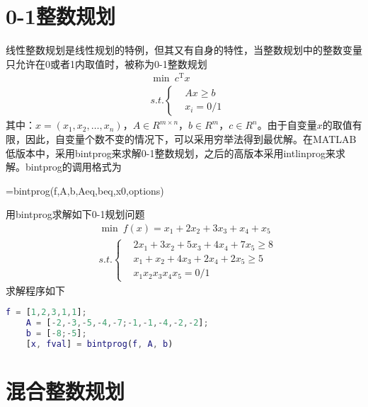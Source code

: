 \section{0-1整数规划}
    \par
    线性整数规划是线性规划的特例，但其又有自身的特性，当整数规划中的整数变量只允许在0或者1内取值时，被称为0-1整数规划
    \begin{align*}
    & \mathop{\min}\ c^\mathrm{T} x\\
    &s.t.\left\{
    \begin{aligned}
    &Ax \geqslant b\\
    &x_i = 0/1
    \end{aligned}
    \right.
    \end{align*}
    其中：$x=(x_1,x_2,\ldots,x_n)$，$A \in R^{m\times n}$，$b \in R^m$，$c \in R^n$。由于自变量$x$的取值有限，因此，自变量个数不变的情况下，可以采用穷举法得到最优解。在MATLAB低版本中，采用bintprog来求解0-1整数规划，之后的高版本采用intlinprog来求解。bintprog的调用格式为
    \par
    [x,fval,exitflag,output]=bintprog(f,A,b,Aeq,beq,x0,options)
    \par
    用bintprog求解如下0-1规划问题
    \begin{align*}
    &\mathop {\min} \ f(x)=x_1+2x_2+3x_3+x_4+x_5\\
    &s.t.\left\{
    \begin{aligned}
    &2x_1+3x_2+5x_3+4x_4+7x_5 \geqslant 8\\
    &x_1+x_2+4x_3+2x_4+2x_5 \geqslant 5\\
    &x_1x_2x_3x_4x_5 = 0/1
    \end{aligned}
    \right.
    \end{align*}
    求解程序如下
    \begin{lstlisting}[language=Matlab]
    f = [1,2,3,1,1];
    A = [-2,-3,-5,-4,-7;-1,-1,-4,-2,-2];
    b = [-8;-5];
    [x, fval] = bintprog(f, A, b)
    \end{lstlisting}

\section{混合整数规划}

